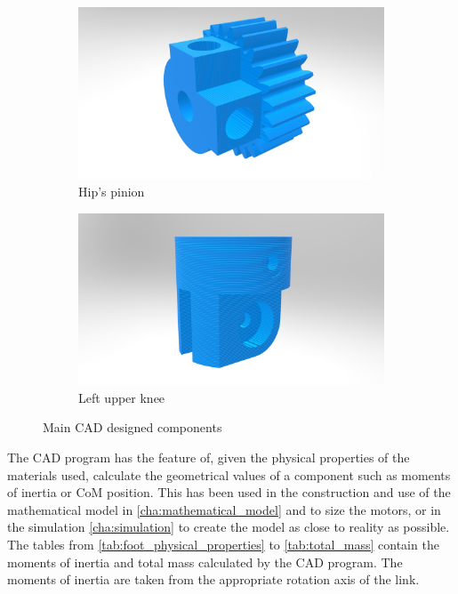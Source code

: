 \begin{figure}[ht!]
    \ContinuedFloat %
    \begin{subfigure}[b]{0.49\textwidth}
        \includegraphics[width=\textwidth]{figures/legs_hip_pinion.jpg}
        \caption{Hip's pinion}
        \label{fig:hip_pinion}
    \end{subfigure}
    \begin{subfigure}[b]{0.49\textwidth}
        \includegraphics[width=\textwidth]{figures/legs_knee_upper.jpg}
        \caption{Left upper knee}
        \label{fig:knee_upper}
    \end{subfigure}
    \caption{Main CAD designed components}
\end{figure}

The CAD program has the feature of, given the physical properties of the materials used, calculate the geometrical values of a component such as moments of inertia or CoM position.
This has been used in the construction and use of the mathematical model in \ref{cha:mathematical_model} and to size the motors, or in the simulation \ref{cha:simulation} to create the model as close to reality as possible.
The tables from \ref{tab:foot_physical_properties} to \ref{tab:total_mass} contain the moments of inertia and total mass calculated by the CAD program.
The moments of inertia are taken from the appropriate rotation axis of the link.

